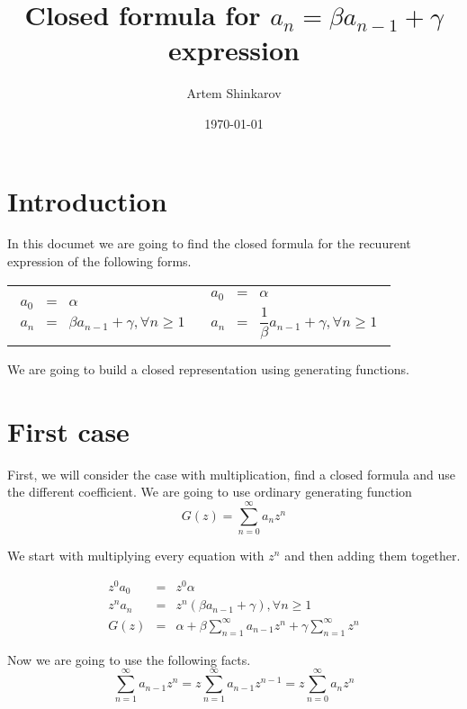 \documentclass{article}
\author{Artem Shinkarov}
\date{\today}
\title{Closed formula for $a_{n} = \beta a_{n-1} + \gamma$ expression}
\begin{document}
\maketitle

\section{Introduction}
In this documet we are going to find the closed formula for the recuurent
expression of the following forms.
\par\noindent
\begin{tabular}{p{}p{}}
\begin{eqnarray*}
  a_0 &=& \alpha \\
  a_n &=& \beta a_{n-1} + \gamma, \forall n \geq 1
\end{eqnarray*}
&
\begin{eqnarray*}
  a_0 &=& \alpha \\
  a_n &=& \dfrac{1}{\beta} a_{n-1} + \gamma, \forall n \geq 1
\end{eqnarray*}
\end{tabular}

\par\noindent
We are going to build a closed representation using generating functions.

\section{First case}
First, we will consider the case with multiplication, find a closed formula
and use the different coefficient. We are going to use ordinary generating
function
\begin{equation}
  G(z) = \sum\limits_{n = 0}^{\infty} {a_n z^n} \label{eq:genfunc}
\end{equation}

We start with multiplying every equation with $z^n$ and then adding them
together.

\begin{eqnarray*}
  z^0 a_0 &=& z^0 \alpha \\
  z^n a_n &=& z^n \left(\beta a_{n-1} + \gamma\right), \forall n \geq 1 \\
  G(z) &=& \alpha + \beta\sum\limits_{n = 1}^{\infty}{a_{n-1}z^n} + 
	   \gamma\sum\limits_{n=1}^{\infty}z^n
\end{eqnarray*}

Now we are going to use the following facts.
\begin{equation}
  \sum\limits_{n=1}^{\infty}{a_{n-1}z^n} 
    = z\sum\limits_{n=1}^{\infty}{a_{n-1}z^{n-1}}
    = z\sum\limits_{n=0}^{\infty}{a_n z^n} 
    \label{eq:fact1}
\end{equation}
\end{document}
